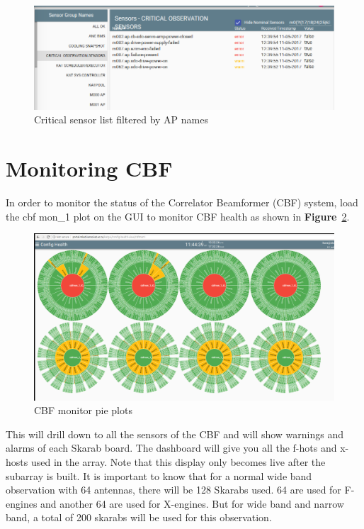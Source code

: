 \begin{figure}[!thb]
	\centering
	\includegraphics[scale=0.34]{Chapters/images/image88.png}
	
	\caption{Critical sensor list filtered by AP names}
	\label{fig:image88}
\end{figure}


\section{ Monitoring CBF}
In order to monitor the status of the Correlator Beamformer (CBF) system, load the cbf mon\_1 plot on the GUI to monitor CBF health as shown in \textbf{Figure}~\ref{fig:image122}. 


\begin{figure}[H]
	\centering
	\includegraphics[scale=0.23]{Chapters/images/image122.png}
	
	\caption{CBF monitor pie plots}
	\label{fig:image122}
\end{figure}

This will drill down to all the sensors of the CBF and will show warnings and alarms of each Skarab board. The dashboard will give you all the f-hots and x-hosts used in the array. Note that this display only becomes live after the subarray is built. 
It is important to know that for a normal wide band observation with 64 antennas, there will be 128 Skarabs used. 64 are used for F-engines and another 64 are used for X-engines.  But for wide band and narrow band, a total of 200 skarabs will be used for this observation. 

